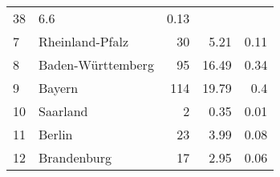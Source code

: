\begin{longtable}{lXrrr}
       \num{38} &
       \num[round-mode=places,round-precision=2]{6,6} &
         \num[round-mode=places,round-precision=2]{0,13} \\

     7 &
     \multicolumn{1}{X}{ Rheinland-Pfalz   } &


       \num{30} &
       \num[round-mode=places,round-precision=2]{5,21} &
         \num[round-mode=places,round-precision=2]{0,11} \\

     8 &
     \multicolumn{1}{X}{ Baden-Württemberg   } &


       \num{95} &
       \num[round-mode=places,round-precision=2]{16,49} &
         \num[round-mode=places,round-precision=2]{0,34} \\

     9 &
     \multicolumn{1}{X}{ Bayern   } &


       \num{114} &
       \num[round-mode=places,round-precision=2]{19,79} &
         \num[round-mode=places,round-precision=2]{0,4} \\

     10 &
     \multicolumn{1}{X}{ Saarland   } &


       \num{2} &
       \num[round-mode=places,round-precision=2]{0,35} &
         \num[round-mode=places,round-precision=2]{0,01} \\

     11 &
     \multicolumn{1}{X}{ Berlin   } &


       \num{23} &
       \num[round-mode=places,round-precision=2]{3,99} &
         \num[round-mode=places,round-precision=2]{0,08} \\

     12 &
     \multicolumn{1}{X}{ Brandenburg   } &


       \num{17} &
       \num[round-mode=places,round-precision=2]{2,95} &
         \num[round-mode=places,round-precision=2]{0,06} \\


\end{longtable}
